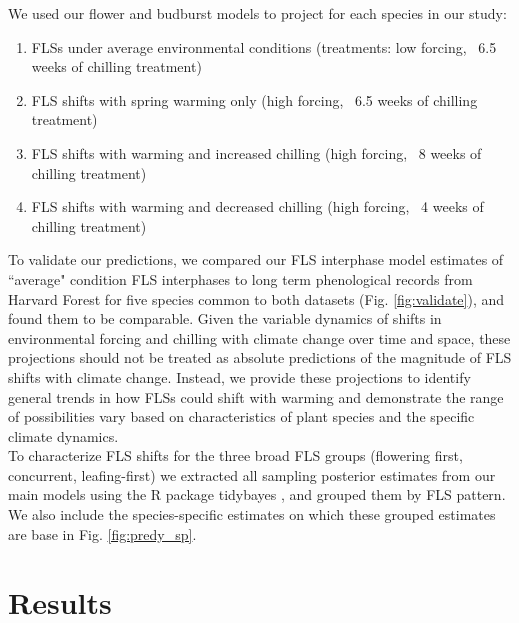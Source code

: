 \documentclass[11pt]{article}\usepackage[]{graphicx}\usepackage[]{color}
\begin{document}
\noindent We used our flower and budburst models to project for each species in our study:\\
\begin{enumerate}
\item FLSs under average environmental conditions  (treatments: low forcing, ~6.5 weeks of chilling treatment)
\item FLS shifts with spring warming only (high forcing, ~6.5 weeks of chilling treatment)
\item FLS shifts with warming and increased chilling (high forcing, ~8 weeks of chilling treatment)
\item FLS shifts with warming and decreased chilling (high forcing, ~4 weeks of chilling treatment)
\end{enumerate}

\noindent To validate our predictions, we compared our FLS interphase model estimates of ``average" condition FLS interphases to long term phenological records from Harvard Forest \citep{OKeefe2015} for five species common to both datasets (Fig. \ref{fig:validate}), and found them to be comparable. Given the variable dynamics of shifts in environmental forcing and chilling with climate change over time and space, these projections should not be treated as absolute predictions of the magnitude of FLS shifts with climate change. Instead, we provide these projections to identify general trends in how FLSs could shift with warming and demonstrate the range of possibilities vary based on characteristics of plant species and the specific climate dynamics.\\

\noindent To characterize FLS shifts for the three broad FLS groups (flowering first, concurrent, leafing-first) we extracted all sampling posterior estimates from our main models using the R package tidybayes \citep{Kay2020}, and grouped them by FLS pattern. We also include the species-specific estimates on which these grouped estimates are base in Fig. \ref{fig:predy_sp}.  \\ 

\section*{Results} 
\end{document}
